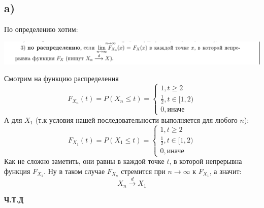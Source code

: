 \documentclass[a4paper,12pt]{article}
\begin{document}
\subsection*{a)}
По определению хотим:
\begin{center}
\includegraphics[scale=0.4]{4.png}
\end{center}
Смотрим на функцию распределения
\[
F_{X_n}(t) = P(X_n \leq t) = 
\begin{cases}
1, t \geq 2 \\
\frac{1}{2}, t \in [1, 2) \\
0,  \text{иначе}
\end{cases}
\]
А для $X_1$ (т.к условия нашей последовательности выполняется для любого $n$):
\[
F_{X_1}(t) = P(X_1 \leq t) = 
\begin{cases}
1, t \geq 2 \\
\frac{1}{2}, t \in [1, 2) \\
0,  \text{иначе}
\end{cases}
\]
Как не сложно заметить, они равны в каждой точке $t$, в которой непрерывна функция $F_{X_1}$. Ну в таком случае $F_{X_n}$ стремится при $n \rightarrow \infty$ к $F_{X_1}$, а значит:
\[
X_n \overset{d}{\longrightarrow} X_1
\]
\begin{center}
\textbf{Ч.Т.Д} 
\end{center}
\end{document}
